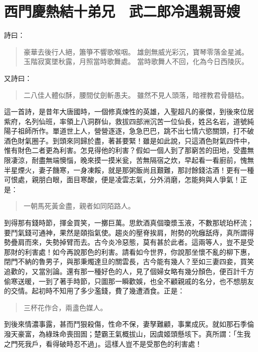 
\chapter{西門慶熱結十弟兄　武二郎冷遇親哥嫂}

詩曰：
\begin{quote}
豪華去後行人絕，簫箏不響歌喉咽。
雄劍無威光彩沉，寶琴零落金星滅。
玉階寂寞墜秋露，月照當時歌舞處。
當時歌舞人不回，化為今日西陵灰。
\end{quote}

又詩曰：
\begin{quote}
二八佳人體似酥，腰間仗劍斬愚夫。
雖然不見人頭落，暗裡教君骨髓枯。
\end{quote}

這一首詩，是昔年大唐國時，一個修真煉性的英雄，入聖超凡的豪傑，到後來位居紫府，名列仙班，率領上八洞群仙，救拔四部洲沉苦一位仙長，姓呂名岩，道號純陽子祖師所作。單道世上人，營營逐逐，急急巴巴，跳不出七情六慾關頭，打不破酒色財氣圈子。到頭來同歸於盡，著甚要緊！雖是如此說，只這酒色財氣四件中，惟有財色二者更為利害。怎見得他的利害？假如一個人到了那窮苦的田地，受盡無限凄涼，耐盡無端懊惱，晚來摸一摸米瓮，苦無隔宿之炊，早起看一看廚前，愧無半星煙火，妻子饑寒，一身凍餒，就是那粥飯尚且艱難，那討餘錢沽酒！更有一種可恨處，親朋白眼，面目寒酸，便是凌雲志氣，分外消磨，怎能夠與人爭氣！正是：
\begin{quote}
一朝馬死黃金盡，親者如同陌路人。
\end{quote}

到得那有錢時節，揮金買笑，一擲巨萬。思飲酒真個瓊漿玉液，不數那琥珀杯流；要鬥氣錢可通神，果然是頤指氣使。趨炎的壓脊挨肩，附勢的吮癰舐痔，真所謂得勢疊肩而來，失勢掉臂而去。古今炎冷惡態，莫有甚於此者。這兩等人，豈不是受那財的利害處！如今再說那色的利害。請看如今世界，你說那坐懷不亂的柳下惠，閉門不納的魯男子，與那秉燭達旦的關雲長，古今能有幾人？至如三妻四妾，買笑追歡的，又當別論。還有那一種好色的人，見了個婦女略有幾分顏色，便百計千方偷寒送暖，一到了著手時節，只圖那一瞬歡娛，也全不顧親戚的名分，也不想朋友的交情。起初時不知用了多少濫錢，費了幾遭酒食。正是：
\begin{quote}
三杯花作合，兩盞色媒人。
\end{quote}

到後來情濃事露，甚而鬥狠殺傷，性命不保，妻孥難顧，事業成灰。就如那石季倫潑天豪富，為綠珠命喪囹圄；楚霸王氣概拔山，因虞姬頭懸垓下。真所謂：「生我之門死我戶，看得破時忍不過」。這樣人豈不是受那色的利害處！


